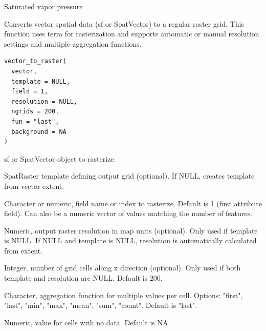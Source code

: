 \documentclass[a4paper]{book}
\begin{document}
%
\begin{Value}
Saturated vapor pressure 
\end{Value}
%
\begin{Description}\relax
Converts vector spatial data (sf or SpatVector) to a regular raster grid.
This function uses terra for rasterization and supports automatic or manual
resolution settings and multiple aggregation functions.
\end{Description}
%
\begin{Usage}
\begin{verbatim}
vector_to_raster(
  vector,
  template = NULL,
  field = 1,
  resolution = NULL,
  ngrids = 200,
  fun = "last",
  background = NA
)
\end{verbatim}
\end{Usage}
%
\begin{Arguments}
\begin{ldescription}
\item[\code{vector}] sf or SpatVector object to rasterize.

\item[\code{template}] SpatRaster template defining output grid (optional).
If NULL, creates template from vector extent.

\item[\code{field}] Character or numeric, field name or index to rasterize.
Default is 1 (first attribute field). Can also be a numeric vector
of values matching the number of features.

\item[\code{resolution}] Numeric, output raster resolution in map units (optional).
Only used if template is NULL. If NULL and template is NULL,
resolution is automatically calculated from extent.

\item[\code{ngrids}] Integer, number of grid cells along x direction (optional).
Only used if both template and resolution are NULL. Default is 200.

\item[\code{fun}] Character, aggregation function for multiple values per cell.
Options: "first", "last", "min", "max", "mean", "sum", "count".
Default is "last".

\item[\code{background}] Numeric, value for cells with no data. Default is NA.
\end{ldescription}
\end{Arguments}
\end{document}
